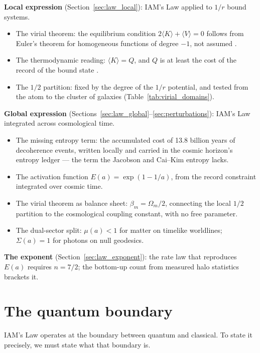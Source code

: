 \textbf{Local expression} (Section~\ref{sec:law_local}): IAM's Law applied to $1/r$ bound systems.
\begin{itemize}
\item The virial theorem: the equilibrium condition $2\langle K\rangle+\langle V\rangle=0$ follows from Euler's theorem for homogeneous functions of
degree $-1$, not assumed \derived.
\item The thermodynamic reading: $\langle K\rangle=Q$, and $Q$ is at least the cost of the record of the bound state \interp.
\item The $1/2$ partition: fixed by the degree of the $1/r$ potential, and tested from the atom to the cluster of galaxies (Table~\ref{tab:virial_domains}).
\end{itemize}
\textbf{Global expression} (Sections~\ref{sec:law_global}--\ref{sec:perturbations}): IAM's Law integrated across cosmological time.
\begin{itemize}
\item The missing entropy term: the accumulated cost of 13.8 billion years of decoherence events, written locally and carried in the cosmic horizon's entropy ledger --- the term the
Jacobson and Cai--Kim entropy lacks.
\item The activation function $E(a)=\exp(1-1/a)$, from the record constraint integrated over cosmic time.
\item The virial theorem as balance sheet: $\beta_m=\Omega_m/2$, connecting the local $1/2$ partition to the cosmological coupling constant, with no
free parameter.
\item The dual-sector split: $\mu(a)<1$ for matter on timelike worldlines; $\Sigma(a)=1$ for photons on null geodesics.
\end{itemize}
\textbf{The exponent} (Section~\ref{sec:law_exponent}): the rate law that reproduces $E(a)$ requires $n=7/2$; the bottom-up count from measured halo
statistics brackets it.

\section{The quantum boundary}
IAM's Law operates at the boundary between quantum and classical. To state it precisely, we must state what that boundary is.


